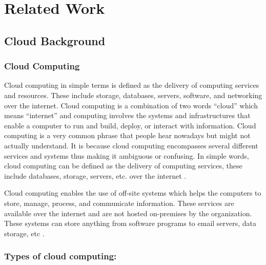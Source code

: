 
\chapter{Related Work}

\section{Cloud Background}

\subsection{Cloud Computing}
Cloud computing in simple terms is defined as the delivery of computing services and resources. These include
storage, databases, servers, software, and networking over the internet. Cloud computing is a combination of two
words “cloud” which means “internet” and computing involves the systems and infrastructures that enable a computer to run and build, deploy, or interact with information. Cloud computing is a very common phrase that people hear nowadays but might not actually understand. It is because cloud computing encompasses several different services and systems thus making it ambiguous or confusing. In simple words, cloud computing can be defined as the delivery of computing services, these include databases, storage, servers, etc. over the internet \cite{11}.

Cloud computing enables the use of off-site systems which helps the computers to store, manage, process, and
communicate information. These services are available over the internet and are not hosted on-premises by the
organization. These systems can store anything from software programs to email servers, data storage, etc \cite{11}
\cite{12}.

\subsection{Types of cloud computing:}


